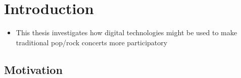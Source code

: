 \chapter{Introduction}

\begin{itemize}
	\item This thesis investigates how digital technologies might be used to make traditional pop/rock concerts more participatory
\end{itemize}
	

\section{Motivation}

